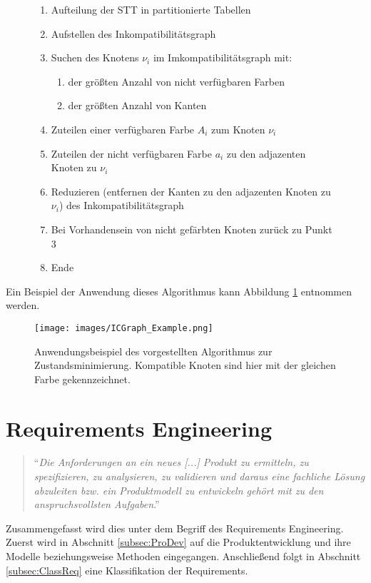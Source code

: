 \begin{figure}[H]
\begin{enumerate}
	\item Aufteilung der STT in partitionierte Tabellen
	\item Aufstellen des Inkompatibilitätsgraph
	\item Suchen des Knotens $\nu_i$ im Imkompatibilitätsgraph mit:
	\begin{enumerate}
		\item der größten Anzahl von nicht verfügbaren Farben
		\item der größten Anzahl von Kanten
	\end{enumerate}
	\item Zuteilen einer verfügbaren Farbe $A_i$ zum Knoten $\nu_i$
	\item Zuteilen der nicht verfügbaren Farbe $a_i$ zu den adjazenten Knoten zu $\nu_i$
	\item Reduzieren (entfernen der Kanten zu den adjazenten Knoten zu $\nu_i$) des Inkompatibilitätsgraph
	\item Bei Vorhandensein von nicht gefärbten Knoten zurück zu Punkt 3
	\item Ende
\end{enumerate}
\end{figure}
Ein Beispiel der Anwendung dieses Algorithmus kann Abbildung \ref{img:ICGraph_Example} entnommen werden. 
\begin{figure}
	\centering
	\texttt{[image: images/ICGraph\_Example.png]}
	\caption{Anwendungsbeispiel des vorgestellten Algorithmus zur Zustandsminimierung. Kompatible Knoten sind hier mit der gleichen Farbe gekennzeichnet. \cite{CK13}}
	\label{img:ICGraph_Example}
\end{figure}

\section{Requirements Engineering}
\label{sec:RE}
\begin{quote}
	"`\textit{Die Anforderungen an ein neues [...] Produkt zu ermitteln, zu spezifizieren, zu analysieren, zu validieren und daraus eine fachliche Lösung abzuleiten bzw. ein Produktmodell zu entwickeln gehört mit zu den anspruchsvollsten Aufgaben}."' \cite{Bal09}
\end{quote} 
Zusammengefasst wird dies unter dem Begriff des Requirements Engineering. Zuerst wird in Abschnitt \ref{subsec:ProDev} auf die Produktentwicklung und ihre Modelle beziehungsweise Methoden eingegangen. Anschließend folgt in Abschnitt \ref{subsec:ClassReq} eine Klassifikation der Requirements. 
